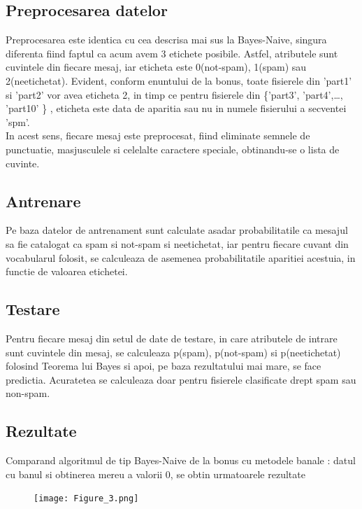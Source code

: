 \documentclass{article}
\begin{document}
\subsection{Preprocesarea datelor}
Preprocesarea este identica cu cea descrisa mai sus la Bayes-Naive, singura diferenta fiind faptul ca acum avem 3 etichete posibile. Astfel,
atributele sunt cuvintele din fiecare mesaj, iar eticheta este 0(not-spam),
1(spam) sau 2(neetichetat). Evident, conform enuntului de la bonus, toate fisierele din 'part1' si 'part2' vor avea eticheta 2, in timp ce pentru fisierele din \{'part3', 'part4',\dots , 'part10' \} , eticheta este data de aparitia sau nu in numele fisierului a secventei 'spm'.\\ In acest sens, fiecare mesaj este preprocesat, fiind eliminate semnele de punctuatie, masjusculele si celelalte caractere speciale, obtinandu-se o lista de cuvinte.
\subsection{Antrenare}
Pe baza datelor de antrenament sunt calculate asadar probabilitatile ca mesajul sa fie catalogat ca spam si not-spam si neetichetat, iar pentru fiecare cuvant din vocabularul folosit, se calculeaza de asemenea probabilitatile aparitiei acestuia, in functie de valoarea etichetei.\\
\subsection{Testare}
Pentru fiecare mesaj din setul de date de testare, in care atributele de intrare sunt cuvintele din mesaj, se calculeaza p(spam), p(not-spam) si p(neetichetat) folosind Teorema lui Bayes si apoi, pe baza rezultatului mai mare, se face predictia. Acuratetea se calculeaza doar pentru fisierele clasificate drept spam sau non-spam.\\
\subsection{Rezultate}
    Comparand algoritmul de tip Bayes-Naive de la bonus cu metodele banale : datul cu banul si obtinerea mereu a valorii 0, se obtin urmatoarele rezultate
    \begin{figure}[ht]
    \texttt{[image: Figure\_3.png]}
    \label{fig:result_image}
    \end{figure}
\\
\end{document}
